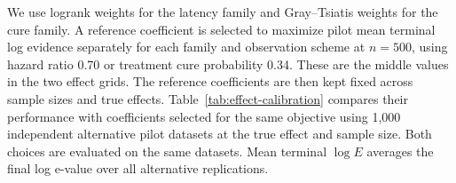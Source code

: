 \documentclass[12pt]{article}
\theoremstyle{definition}
\theoremstyle{remark}
\begin{document}
We use logrank weights for the latency family and Gray--Tsiatis weights for the cure family. A reference coefficient is selected to maximize pilot mean terminal log evidence separately for each family and observation scheme at $n=500$, using hazard ratio 0.70 or treatment cure probability 0.34. These are the middle values in the two effect grids. The reference coefficients are then kept fixed across sample sizes and true effects. Table~\ref{tab:effect-calibration} compares their performance with coefficients selected for the same objective using 1,000 independent alternative pilot datasets at the true effect and sample size. Both choices are evaluated on the same datasets. Mean terminal $\log E$ averages the final log e-value over all alternative replications.
\par
\begingroup
\scriptsize
\setlength{\tabcolsep}{3pt}
\renewcommand{\arraystretch}{1.08}
\setlength{\LTcapwidth}{\textwidth}
\end{document}
